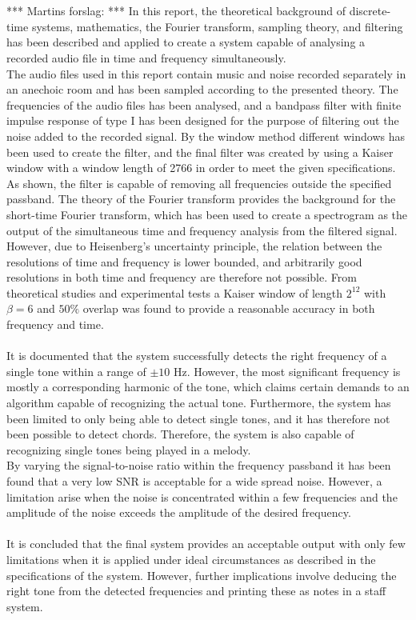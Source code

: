 \\ \\
*** Martins forslag: ***
In this report, the theoretical background of discrete-time systems, mathematics, the Fourier transform, sampling theory, and filtering has been described and applied to create a system capable of analysing a recorded audio file in time and frequency simultaneously.
\\
The audio files used in this report contain music and noise recorded separately in an anechoic room and has been sampled according to the presented theory. The frequencies of the audio files has been analysed, and a bandpass filter with finite impulse response of type I has been designed for the purpose of filtering out the noise added to the recorded signal. By the window method different windows has been used to create the filter, and the final filter was created by using a Kaiser window with a window length of 2766 in order to meet the given specifications. As shown, the filter is capable of removing all frequencies outside the specified passband. The theory of the Fourier transform provides the background for the short-time Fourier transform, which has been used to create a spectrogram as the output of the simultaneous time and frequency analysis from the filtered signal. However, due to Heisenberg's uncertainty principle, the relation between the resolutions of time and frequency is lower bounded, and arbitrarily good resolutions in both time and frequency are therefore not possible. From theoretical studies and experimental tests a Kaiser window of length $2^{12}$ with $\beta = 6$ and $50\%$ overlap was found to provide a reasonable accuracy in both frequency and time.
\\ \\
It is documented that the system successfully detects the right frequency of a single tone within a range of $\pm 10$ Hz. However, the most significant frequency is mostly a corresponding harmonic of the tone, which claims certain demands to an algorithm capable of recognizing the actual tone. Furthermore, the system has been limited to only being able to detect single tones, and it has therefore not been possible to detect chords. Therefore, the system is also capable of recognizing single tones being played in a melody.
\\
By varying the signal-to-noise ratio within the frequency  passband it has been found that a very low SNR is acceptable for a wide spread noise. However, a limitation arise when the noise is concentrated within a few frequencies and the amplitude of the noise exceeds the amplitude of the desired frequency.
\\ \\
It is concluded that the final system provides an acceptable output with only few limitations when it is applied under ideal circumstances as described in the specifications of the system. However, further implications involve deducing the right tone from the detected frequencies and printing these as notes in a staff system.

 